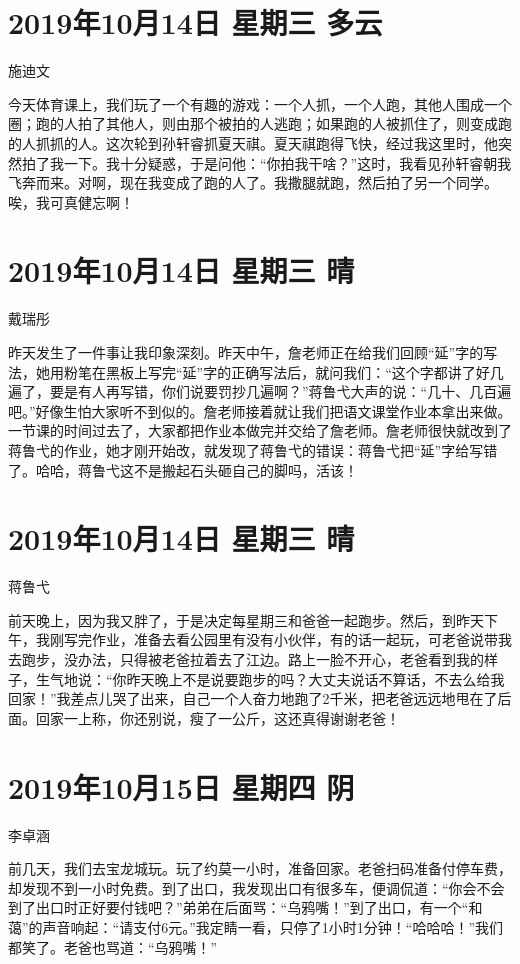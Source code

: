 \section{2019年10月14日 星期三 多云}

施迪文

今天体育课上，我们玩了一个有趣的游戏：一个人抓，一个人跑，其他人围成一个圈；跑的人拍了其他人，则由那个被拍的人逃跑；如果跑的人被抓住了，则变成跑的人抓抓的人。这次轮到孙轩睿抓夏天祺。夏天祺跑得飞快，经过我这里时，他突然拍了我一下。我十分疑惑，于是问他：``你拍我干啥？''这时，我看见孙轩睿朝我飞奔而来。对啊，现在我变成了跑的人了。我撒腿就跑，然后拍了另一个同学。唉，我可真健忘啊！

\section{2019年10月14日 星期三 晴}

戴瑞彤

昨天发生了一件事让我印象深刻。昨天中午，詹老师正在给我们回顾``延''字的写法，她用粉笔在黑板上写完``延''字的正确写法后，就问我们：``这个字都讲了好几遍了，要是有人再写错，你们说要罚抄几遍啊？''蒋鲁弋大声的说：``几十、几百遍吧。''好像生怕大家听不到似的。詹老师接着就让我们把语文课堂作业本拿出来做。一节课的时间过去了，大家都把作业本做完并交给了詹老师。詹老师很快就改到了蒋鲁弋的作业，她才刚开始改，就发现了蒋鲁弋的错误：蒋鲁弋把``延''字给写错了。哈哈，蒋鲁弋这不是搬起石头砸自己的脚吗，活该！

\section{2019年10月14日 星期三 晴}

蒋鲁弋

前天晚上，因为我又胖了，于是决定每星期三和爸爸一起跑步。然后，到昨天下午，我刚写完作业，准备去看公园里有没有小伙伴，有的话一起玩，可老爸说带我去跑步，没办法，只得被老爸拉着去了江边。路上一脸不开心，老爸看到我的样子，生气地说：``你昨天晚上不是说要跑步的吗？大丈夫说话不算话，不去么给我回家！''我差点儿哭了出来，自己一个人奋力地跑了2千米，把老爸远远地甩在了后面。回家一上称，你还别说，瘦了一公斤，这还真得谢谢老爸！

\section{2019年10月15日 星期四 阴}

李卓涵

前几天，我们去宝龙城玩。玩了约莫一小时，准备回家。老爸扫码准备付停车费，却发现不到一小时免费。到了出口，我发现出口有很多车，便调侃道：``你会不会到了出口时正好要付钱吧？''弟弟在后面骂：``乌鸦嘴！''到了出口，有一个``和蔼''的声音响起：``请支付6元。''我定睛一看，只停了1小时1分钟！``哈哈哈！''我们都笑了。老爸也骂道：``乌鸦嘴！''

